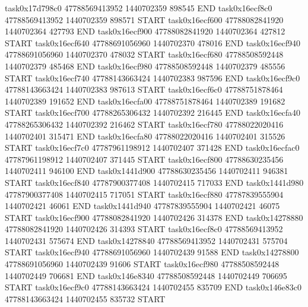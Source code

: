 task0x17d798c0 47788569413952          1440702359               898545  END
task0x16ecf8c0 47788569413952          1440702359               898571  START
task0x16ecf600 47788082841920          1440702364               427793  END
task0x16ecf900 47788082841920          1440702364               427812  START
task0x16ecf640 47788691056960          1440702370               478016  END
task0x16ecf940 47788691056960          1440702370               478032  START
task0x16ecf680 47788508592448          1440702379               485468  END
task0x16ecf980 47788508592448          1440702379               485556  START
task0x16ecf740 47788143663424          1440702383               987596  END
task0x16ecf9c0 47788143663424          1440702383               987613  START
task0x16ecf6c0 47788751878464          1440702389               191652  END
task0x16ecfa00 47788751878464          1440702389               191682  START
task0x16ecf700 47788265306432          1440702392               216445  END
task0x16ecfa40 47788265306432          1440702392               216462  START
task0x16ecf780 47788022020416          1440702401               315471  END
task0x16ecfa80 47788022020416          1440702401               315526  START
task0x16ecf7c0 47787961198912          1440702407               371428  END
task0x16ecfac0 47787961198912          1440702407               371445  START
task0x16ecf800 47788630235456          1440702411               946100  END
task0x1441d900 47788630235456          1440702411               946381  START
task0x16ecf840 47787900377408          1440702415               717033  END
task0x1441d980 47787900377408          1440702415               717051  START
task0x16ecf880 47787839555904          1440702421                46061  END
task0x1441d940 47787839555904          1440702421                46075  START
task0x16ecf900 47788082841920          1440702426               314378  END
task0x14278880 47788082841920          1440702426               314393  START
task0x16ecf8c0 47788569413952          1440702431               575674  END
task0x14278840 47788569413952          1440702431               575704  START
task0x16ecf940 47788691056960          1440702439                91588  END
task0x14278800 47788691056960          1440702439                91606  START
task0x16ecf980 47788508592448          1440702449               706681  END
task0x146e8340 47788508592448          1440702449               706695  START
task0x16ecf9c0 47788143663424          1440702455               835709  END
task0x146e83c0 47788143663424          1440702455               835732  START
